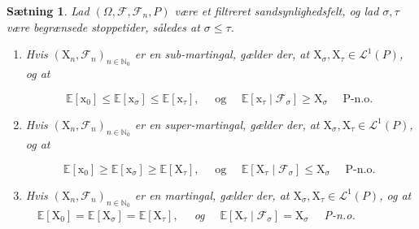 \documentclass{article}
\newcommand{\1}{\mathbbm{1}}
\theoremstyle{boxed}
\newtheorem{proposition}[theorem]{Sætning}
\begin{document}
\begin{theorem-box}
    \begin{proposition}
        Lad $\left(\Omega, \mathcal{F}, \mathcal{F}_n, P\right)$ være et filtreret sandsynlighedsfelt, og lad $\sigma, \tau$ være begrænsede stoppetider, således at $\sigma \leq \tau$.
\begin{enumerate}
    \item[\textnormal{(i)}] Hvis $\left(\mathrm{X}_n, \mathcal{F}_n\right)_{n \in \mathbb{N}_0}$ er en sub-martingal, gælder der, at $\mathrm{X}_\sigma, \mathrm{X}_\tau \in \mathcal{L}^1(P)$, og at

    $$
    \mathbb{E}\left[\mathrm{x}_0\right] \leq \mathbb{E}\left[\mathrm{x}_\sigma\right] \leq \mathbb{E}\left[\mathrm{x}_\tau\right], \quad \text { og } \quad \mathbb{E}\left[\mathrm{x}_\tau \mid \mathcal{F}_\sigma\right] \geq \mathrm{X}_\sigma \quad \text { P-n.o. }
    $$
    
    \item[\textnormal{(ii)}] Hvis $\left(\mathrm{X}_n, \mathcal{F}_n\right)_{n \in \mathbb{N}_0}$ er en super-martingal, gælder der, at $\mathrm{X}_\sigma, \mathrm{X}_\tau \in \mathcal{L}^1(P)$, og at

    $$
    \mathbb{E}\left[\mathrm{x}_0\right] \geq \mathbb{E}\left[\mathrm{x}_\sigma\right] \geq \mathbb{E}\left[\mathrm{X}_\tau\right], \quad \text { og } \quad \mathbb{E}\left[\mathrm{X}_\tau \mid \mathcal{F}_\sigma\right] \leq \mathrm{X}_\sigma \quad \text { P-n.o. }
    $$
    \item[\textnormal{(iii)}] Hvis $\left(\mathrm{X}_n, \mathcal{F}_n\right)_{n \in \mathbb{N}_0}$ er en martingal, gælder der, at $\mathrm{X}_\sigma, \mathrm{X}_\tau \in \mathcal{L}^1(P)$, og at $\quad \mathbb{E}\left[\mathrm{X}_0\right]=\mathbb{E}\left[\mathrm{X}_\sigma\right]=\mathbb{E}\left[\mathrm{X}_\tau\right], \quad$ og $\quad \mathbb{E}\left[\mathrm{X}_\tau \mid \mathcal{F}_\sigma\right]=\mathrm{X}_\sigma \quad$ P-n.o.
  
\end{enumerate}
  \end{proposition}
\end{theorem-box}
\end{document}
